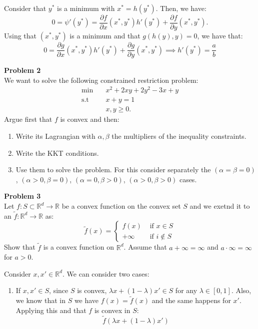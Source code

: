 \documentclass[a4paper]{article}
\newenvironment{problem}[2][Problem]
    { \begin{mdframed}[backgroundcolor=gray!20] \textbf{#1 #2} \\}
    {  \end{mdframed}}
\newcommand{\R}{\mathbb R}
\begin{document}
Consider that \(y^*\) is a minimum with \(x^* = h(y^*)\). Then, we have:
\[
0 = \psi'(y^*) = \frac{\partial f}{\partial x} (x^*, y^*)h'(y^*) + \frac{\partial f}{\partial y}(x^*, y^*).
\]
Using that \((x^*,y^*)\) is a minimum and that \(g(h(y),y) = 0\), we have that:
\[
0 = \frac{\partial g}{\partial x}(x^*, y^*)h'(y^*) + \frac{\partial g}{\partial y}(x^*, y^*) \implies h'(y^*) = \frac{a}{b}   
\]




\begin{problem}{2}
We want to solve the following constrained restriction problem:
\begin{align*}
  \min \quad       & x^{2} + 2xy + 2y^2 - 3x + y \\
  \text{s.t} \quad & x + y = 1            \\
                   & x,y \geq 0.
\end{align*}
Argue first that \(f\) is convex and then:
\begin{enumerate}
  \item Write its Lagrangian with \(\alpha,\beta\) the multipliers of the inequality constraints.
  \item Write the KKT conditions.
  \item Use them to solve the problem. For this consider separately the \((\alpha = \beta = 0)\), \((\alpha > 0, \beta = 0)\), \((\alpha = 0, \beta > 0)\), \((\alpha > 0, \beta > 0)\) cases.
\end{enumerate}
\end{problem}

\begin{problem}{3}
Let \(f: S \subset \R^d \to \R\) be a convex function on the convex set \(S\) and we exetnd it to an \(\tilde f : \R^d \to \R\) as:
\[
\tilde f(x) = \begin{cases}
f(x) & \text{ if } x \in S\\
+\infty & \text{ if } i \notin S 
\end{cases}
\]
Show that \(\tilde f\) is a convex function on \(\R^d\). Assume that \(a+\infty = \infty\) and \(a\cdot \infty = \infty\) for \(a > 0\).
\end{problem}

Consider \(x,x' \in \R^d\). We can consider two cases:

\begin{enumerate}
\item If \(x,x' \in S\), since \(S\) is convex, \(\lambda x + (1-\lambda)x' \in S\) for any \(\lambda \in [0,1]\). Also, we know that in \(S\) we have \(f(x) = \tilde f(x)\) and the same happens for \(x'\). Applying this and that \(f\) is convex in \(S\):
\[
\tilde f(\lambda x + (1-\lambda)x')    
\]
\end{enumerate}
\end{document}
